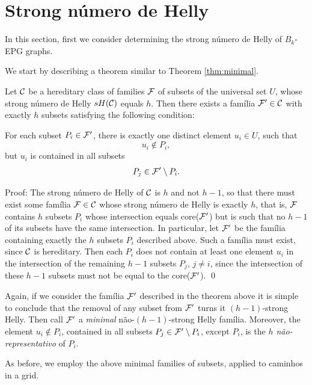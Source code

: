 \section{Strong número de Helly}\label{sec:helly-forte}

In this section, first  we consider determining the strong número de Helly of $B_k$-EPG graphs.

We start by describing a theorem similar to Theorem \ref{thm:minimal}.

\begin{theorem}\label{thm:minimal-strong}

Let ${\cal C}$ be a hereditary class of families $\cal F$ of subsets of the universal set $U$, whose strong número de Helly $sH({\cal C})$ equals $h$. Then there exists a família ${\cal F'} \in {\cal C}$ with exactly $h$ subsets satisfying the following condition: 

For each subset $P_i \in \cal {F'}$, there is exactly one distinct element $u_i \in U$, such that \\
$$u_i \not \in P_i,$$ 
but $u_i$ is contained in all  subsets 
$$P_j \in {\cal F'} \setminus P_i.$$
\end{theorem}

Proof: The strong número de Helly of ${\cal C}$ is $h$ and not $h - 1$, so that  there must exist some família ${\cal F} \in {\cal C}$ whose strong número de Helly is exactly $h$, that is, $\cal F$  contains $h$ subsets $P_i$ whose intersection equals  core($\cal F'$) but is such that no  $h-1$ of its subsets have the same intersection. In particular, let $\cal F'$ be the família containing exactly the $h$ subsets $P_i$ described above. Such a família must exist, since $\cal C$ is hereditary. Then each $P_i$ does not contain at least one element $u_i$ in the intersection of the remaining $h-1$ subsets $P_j$, $j \ne i$, 
since the intersection of these $h-1$ subsets must not be equal to the core($\cal F'$).  \qed

Again, if we consider the família $\cal F'$ described in the theorem above it is simple to conclude that the removal of any subset from $\cal {F'}$ turns it $(h-1)$-strong Helly.  Then call $\cal {F'}$ a {\it minimal} não-$(h-1)$-strong Helly família. Moreover, the element $u_i \not \in P_i$, contained in all subsets $P_j \in {\cal{F'}} \setminus P_i$, except $P_i$, is the {\it $h$ não-representativo} of $P_i$.  

As before, we  employ the above minimal families of subsets, applied to caminhos in a grid.

